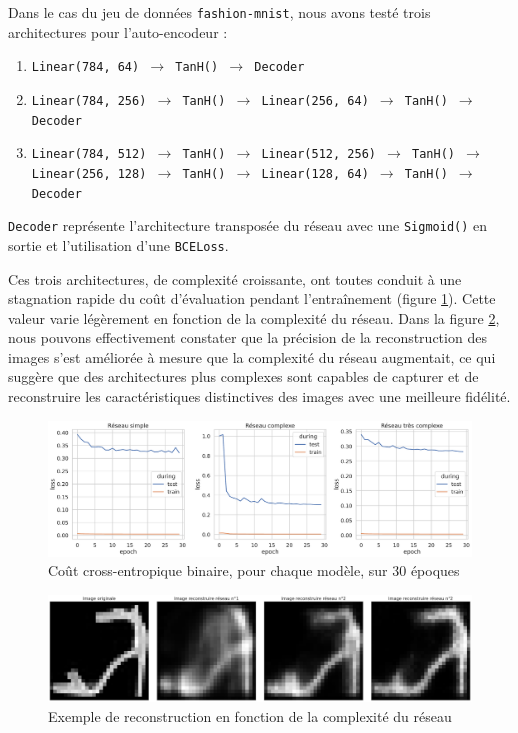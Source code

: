 \documentclass{article}
\begin{document}
Dans le cas du jeu de données \texttt{fashion-mnist}, nous avons testé trois architectures pour l'auto-encodeur :

\begin{enumerate}
    \item \label{reseau1} \texttt{Linear(784, 64) $\rightarrow$ TanH() $\rightarrow$ Decoder} 
    \item \texttt{Linear(784, 256) $\rightarrow$ TanH() $\rightarrow$ Linear(256, 64) $\rightarrow$ TanH() $\rightarrow$ Decoder}
    \item \texttt{Linear(784, 512) $\rightarrow$ TanH() $\rightarrow$ Linear(512, 256) $\rightarrow$ TanH() $\rightarrow$ Linear(256, 128) $\rightarrow$ TanH() $\rightarrow$ Linear(128, 64) $\rightarrow$ TanH() $\rightarrow$ Decoder}
\end{enumerate}

\texttt{Decoder} représente l'architecture transposée du réseau avec une \texttt{Sigmoid()} en sortie et l'utilisation d'une \texttt{BCELoss}. 

Ces trois architectures, de complexité croissante, ont toutes conduit à une stagnation rapide du coût d'évaluation pendant l'entraînement (figure \ref{fig:lossencoder}). Cette valeur varie légèrement en fonction de la complexité du réseau. Dans la figure \ref{fig:reconstruction}, nous pouvons effectivement constater que la précision de la reconstruction des images s'est améliorée à mesure que la complexité du réseau augmentait, ce qui suggère que des architectures plus complexes sont capables de capturer et de reconstruire les caractéristiques distinctives des images avec une meilleure fidélité.

\begin{figure}[htbp]
    \centering
    \includegraphics*[width=.85\textwidth]{loss_encoder_fashion_3_networks.pdf}
    \caption{Coût cross-entropique binaire, pour chaque modèle, sur 30 époques}
    \label{fig:lossencoder}
\end{figure}

\begin{figure}[htbp]
    \centering
    \includegraphics*[width=.85\textwidth]{reconstruction_per_network_cplxity.pdf}
    \caption{Exemple de reconstruction en fonction de la complexité du réseau}
    \label{fig:reconstruction}
\end{figure}
\end{document}
